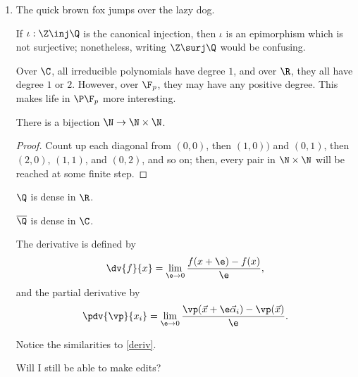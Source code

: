 \documentclass[onesided]{../../ccg-pset}
\author{Colton Grainger}
\date{\today}
\begin{document}
\maketitle

\begin{enumerate}
\item
	\label{first}
	The quick brown fox jumps over the lazy dog.

	\begin{thm}
	If \(\iota:\Z\inj\Q\) is the canonical injection, then \(\iota\) is an epimorphism which is not surjective;
	nonetheless, writing \(\Z\surj\Q\) would be confusing.
	\end{thm}

	Over \(\C\), all irreducible polynomials have degree \(1\), and over \(\R\), they all have degree \(1\) or \(2\).
	However, over \(\F_p\), they may have any positive degree. This makes life in \(\P\F_p\) more interesting.

	\begin{lem}
	There is a bijection \(\N\to\N\times\N\).
	\end{lem}

	\begin{proof}
	Count up each diagonal from \((0,0)\), then \((1,0))\) and \((0,1)\), then \((2,0)\), \((1,1)\), and \((0,2)\), and
	so on; then, every pair in \(\N\times\N\) will be reached at some finite step.
	\end{proof}

	\begin{claim}
	\(\Q\) is dense in \(\R\).
	\end{claim}

	\begin{claim*}
	\(\overline\Q\) is dense in \(\C\).
	\end{claim*}

	The derivative is defined by
	\begin{equation}
	\label{deriv}
		\dv{f}{x} = \lim_{\e\to 0} \frac{f(x+\e) - f(x)}{\e},
	\end{equation}
	and the partial derivative by
	\begin{equation}
		\pdv{\vp}{x_i} = \lim_{\e\to 0} \frac{\vp(\vec x+\e \vec\alpha_i) - \vp(\vec x)}{\e}.
	\end{equation}

	Notice the similarities to \eqref{deriv}.

	Will I still be able to make edits?


\end{enumerate}
\end{document}
